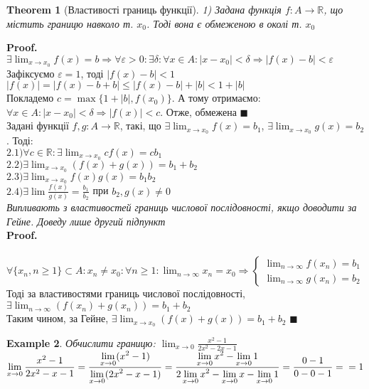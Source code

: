 \documentclass[a4paper, 14pt]{extarticle}
\def\huge{\displaystyle}
\def\bigline{\vspace{5mm}\\}
\theoremstyle{theoremdd}
\newtheorem{theorem}{Theorem}[subsection]
\theoremstyle{theoremdd}
\theoremstyle{theoremdd}
\theoremstyle{theoremdd}
\newtheorem{example}[theorem]{Example}
\theoremstyle{theoremdd}
\theoremstyle{theoremdd}
\theoremstyle{theoremdd}
\theoremstyle{theoremdd}
\newenvironment{pf}{\vspace*{-3mm} \textbf{Proof. \\}}{$\blacksquare$}
\begin{document}
	\begin{theorem}[Властивості границь функції]
	1) Задана функція $f: A \to \mathbb{R}$, що містить границю навколо т. $x_0$. Тоді вона є обмеженою в околі т. $x_0$
	\end{theorem}
	\begin{pf}
	$\exists \huge \lim_{x \to x_0} f(x) = b \Rightarrow \forall \varepsilon > 0: \exists \delta: \forall x \in A: |x-x_0|<\delta \Rightarrow |f(x)-b|<\varepsilon$\\
	Зафіксуємо $\varepsilon = 1$, тоді $|f(x) -b| < 1$\\
	$|f(x)| = |f(x) - b + b| \leq |f(x) - b| + |b| < 1 + |b|$\\
	Покладемо $c = \max\{1 + |b|, f(x_0) \}$. А тому отримаємо:\\
	$\forall x \in A: |x-x_0| < \delta \Rightarrow |f(x)| < c$. Отже, обмежена 
	\end{pf}
	\bigline
	Задані функції $f,g: A \to \mathbb{R}$, такі, що $\exists \huge \lim_{x \to x_0} f(x) = b_1$, $\exists \huge \lim_{x \to x_0} g(x) = b_2$. Тоді:\\
	$2.1) \forall c \in \mathbb{R}: \exists \huge \lim_{x \to x_0} cf(x) = c b_1$\\
	$2.2) \exists \huge \lim_{x \to x_0} (f(x)+g(x)) = b_1 + b_2$\\
	$2.3) \exists \huge \lim_{x \to x_0} f(x)g(x) = b_1 b_2$\\
	$2.4) \exists \huge \lim \frac{f(x)}{g(x)} = \frac{b_1}{b_2}$ при $b_2, g(x) \neq 0$\\
	\textit{Випливають з властивостей границь числової послідовності, якщо доводити за Гейне. Доведу лише другий підпункт}
	\bigline
	\begin{pf}\\
	$\forall \{x_n, n \geq 1\} \subset A: x_n \neq x_0: \forall n \geq 1: \huge \lim_{n \to \infty} x_n = x_0 \Rightarrow \begin{cases} \huge \lim_{n \to \infty} f(x_n) = b_1 \\ \huge \lim_{n \to \infty} g(x_n) = b_2 \end{cases}$\\
	Тоді за властивостями границь числової послідовності, \\ $\exists \huge \lim_{n \to \infty}( f(x_n)+g(x_n)) = b_1 + b_2$\\
	Таким чином, за Гейне, $\exists \huge \lim_{x \to x_0} (f(x)+g(x)) = b_1 + b_2$
	\end{pf}
	
	\begin{example}
	Обчислити границю: $\huge \lim_{x \to 0} \frac{x^2-1}{2x^2-2x-1}$\\
	$\huge \lim_{x \to 0} \frac{x^2-1}{2x^2-x-1} = \frac{\huge \lim_{x \to 0} (x^2-1)}{\huge \lim_{x \to 0}(2x^2-x-1)} = \frac{\huge \lim_{x \to 0}x^2 - \lim_{x \to 0}1}{\huge 2\lim_{x \to 0}x^2 - \lim_{x \to 0}x - \lim_{x \to 0}1} = \frac{0-1}{0-0-1} = \\ = 1$
	\end{example}
	
\end{document}

